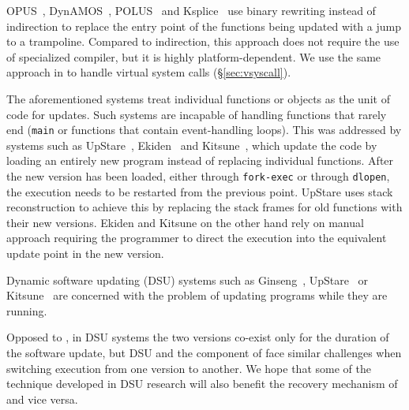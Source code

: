 OPUS~\cite{opus}, DynAMOS~\cite{dynamos}, POLUS~\cite{polus} and
Ksplice~\cite{ksplice} use binary rewriting instead of indirection to replace
the entry point of the functions being updated with a jump to a trampoline.
Compared to indirection, this approach does not require the use of specialized
compiler, but it is highly platform-dependent. We use the same approach in \nx
to handle virtual system calls (\S\ref{sec:vsyscall}).

The aforementioned systems treat individual functions or objects as the unit of
code for updates. Such systems are incapable of handling functions that rarely
end (\eg \lstinline`main` or functions that contain event-handling loops). This
was addressed by systems such as UpStare~\cite{upstare}, Ekiden~\cite{ekiden}
and Kitsune~\cite{kitsune}, which update the code by loading an entirely new
program instead of replacing individual functions. After the new version has
been loaded, either through \lstinline`fork-exec` or through
\lstinline`dlopen`, the execution needs to be restarted from the previous
point. UpStare uses stack reconstruction to achieve this by replacing the stack
frames for old functions with their new versions. Ekiden and Kitsune on the
other hand rely on manual approach requiring the programmer to direct the
execution into the equivalent update point in the new version.


Dynamic software updating (DSU) systems such as Ginseng~\cite{ginseng},
UpStare~\cite{upstare} or Kitsune~\cite{kitsune} are concerned with the problem
of updating programs while they are running.

Opposed to \mx, in DSU systems the two versions co-exist only for the duration
of the software update, but DSU and the \rem component of \mx face similar
challenges when switching execution from one version to another.  We hope that
some of the technique developed in DSU research will also benefit the recovery
mechanism of \mx and vice versa.


